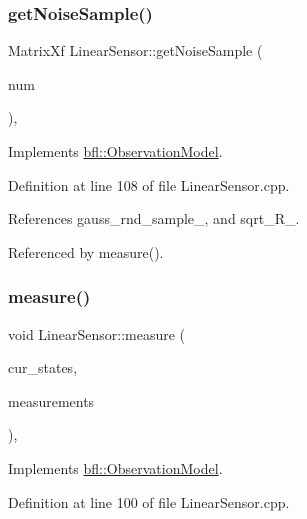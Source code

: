 \subsubsection{\texorpdfstring{get\+Noise\+Sample()}{getNoiseSample()}}
{\footnotesize\ttfamily Matrix\+Xf Linear\+Sensor\+::get\+Noise\+Sample (\begin{DoxyParamCaption}\item[{const int}]{num }\end{DoxyParamCaption})\hspace{0.3cm}{\ttfamily [override]}, {\ttfamily [virtual]}}



Implements \mbox{\hyperlink{classbfl_1_1ObservationModel_a45e8cec2a18ef49bf586c8895c13a31b}{bfl\+::\+Observation\+Model}}.



Definition at line 108 of file Linear\+Sensor.\+cpp.



References gauss\+\_\+rnd\+\_\+sample\+\_\+, and sqrt\+\_\+\+R\+\_\+.



Referenced by measure().

\mbox{\label{classbfl_1_1LinearSensor_a36f36ae6b935a8c535b553ff6a265f6a}} 
\subsubsection{\texorpdfstring{measure()}{measure()}}
{\footnotesize\ttfamily void Linear\+Sensor\+::measure (\begin{DoxyParamCaption}\item[{const Eigen\+::\+Ref$<$ const Eigen\+::\+Matrix\+Xf $>$ \&}]{cur\+\_\+states,  }\item[{Eigen\+::\+Ref$<$ Eigen\+::\+Matrix\+Xf $>$}]{measurements }\end{DoxyParamCaption})\hspace{0.3cm}{\ttfamily [override]}, {\ttfamily [virtual]}}



Implements \mbox{\hyperlink{classbfl_1_1ObservationModel_a0cde643e52b6c24d80d1b49e1b58f4c0}{bfl\+::\+Observation\+Model}}.



Definition at line 100 of file Linear\+Sensor.\+cpp.



